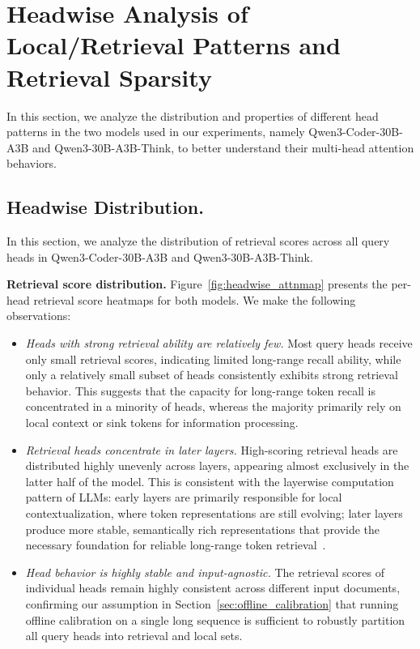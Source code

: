 \section{Headwise Analysis of Local/Retrieval Patterns and Retrieval Sparsity}
\label{appd:headwise}

In this section, we analyze the distribution and properties of different head patterns in the two models used in our experiments, namely Qwen3-Coder-30B-A3B and Qwen3-30B-A3B-Think, to better understand their multi-head attention behaviors.

\subsection{Headwise Distribution.}
\label{appd:distribution}

In this section, we analyze the distribution of retrieval scores across all query heads in Qwen3-Coder-30B-A3B and Qwen3-30B-A3B-Think.

\noindent\textbf{Retrieval score distribution.}
Figure~\ref{fig:headwise_attnmap} presents the per-head retrieval score heatmaps for both models. We make the following observations:

\begin{itemize}[leftmargin=*, itemindent=0pt]
    \item \emph{Heads with strong retrieval ability are relatively few.} Most query heads receive only small retrieval scores, indicating limited long-range recall ability, while only a relatively small subset of heads consistently exhibits strong retrieval behavior. This suggests that the capacity for long-range token recall is concentrated in a minority of heads, whereas the majority primarily rely on local context or sink tokens for information processing.

    \item \emph{Retrieval heads concentrate in later layers.} High-scoring retrieval heads are distributed highly unevenly across layers, appearing almost exclusively in the latter half of the model. This is consistent with the layerwise computation pattern of LLMs: early layers are primarily responsible for local contextualization, where token representations are still evolving; later layers produce more stable, semantically rich representations that provide the necessary foundation for reliable long-range token retrieval~\citep{ghandeharioun2024patchscopes}.

    \item \emph{Head behavior is highly stable and input-agnostic.} The retrieval scores of individual heads remain highly consistent across different input documents, confirming our assumption in Section~\ref{sec:offline_calibration} that running offline calibration on a single long sequence is sufficient to robustly partition all query heads into retrieval and local sets.
\end{itemize}

